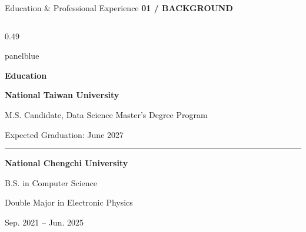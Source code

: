\documentclass[aspectratio=169,10pt]{beamer}
\newcommand{\smalllabel}[1]{{\scriptsize\bfseries\color{Accent}\MakeUppercase{#1}}}
\begin{document}
\begin{frame}{Education \& Professional Experience}
  \vspace{0.05cm}
  \smalllabel{01 / Background}\par
  \vspace{0.22cm}

  \begin{columns}[T,onlytextwidth]

    \begin{column}{0.49\textwidth}
      \begin{beamercolorbox}[
        rounded=true,sep=0.20cm,wd=\linewidth
      ]{panelblue}

        {\normalsize\bfseries\color{AccentBlue}
          Education}\par
        \vspace{0.24cm}

        {\small\bfseries
          National Taiwan University}\par
        \vspace{0.06cm}
        {\small
          M.S. Candidate, Data Science
          Master's Degree Program}\par
        \vspace{0.05cm}
        {\scriptsize\color{Muted}
          Expected Graduation: June 2027}\par

        \vspace{0.26cm}
        {\color{Divider}\rule{0.92\linewidth}{0.4pt}}
        \vspace{0.19cm}

        {\small\bfseries
          National Chengchi University}\par
        \vspace{0.06cm}
        {\small
          B.S. in Computer Science}\par
        {\small
          Double Major in Electronic Physics}\par
        \vspace{0.05cm}
        {\scriptsize\color{Muted}
          Sep. 2021 -- Jun. 2025}\par

      \end{beamercolorbox}
    \end{column}


\end{columns}
\end{frame}
\end{document}
